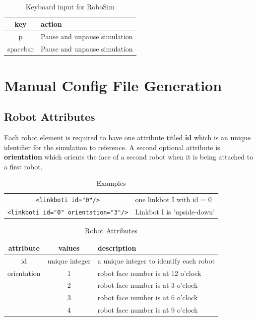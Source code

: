 \documentclass{article}
\begin{document}
\begin{table}[H]
	\begin{center}
	\begin{tabular}{c | l }
		\hline \hline
		\textbf{key} & \textbf{action} \\ \hline
		p & Pause and unpause simulation \\
		spacebar & Pause and unpause simulation \\
		\hline \hline
	\end{tabular}
	\caption{Keyboard input for RoboSim}
	\label{tab:keys}
	\end{center}
\end{table}

\appendix
\section{Manual Config File Generation}
\subsection{Robot Attributes}
Each robot element is required to have one attribute titled \textbf{id} which is an unique identifier for the
simulation to reference.  A second optional attribute is \textbf{orientation} which orients the face of a
second robot when it is being attached to a first robot.

\begin{table}[H]
	\begin{center}
	\begin{tabular}{c | l}
		\hline 
		\verb|<linkboti id="0"/>| & one linkbot I with id = 0 \\
		\verb|<linkboti id="0" orientation="3"/>| & Linkbot I is 'upside-down' \\
		\hline
	\end{tabular}
	\caption{Examples}
	\label{tab:ex}
	\end{center}
\end{table}

\begin{table}[H]
	\begin{center}
	\begin{tabular}{c | c | l}
		\hline \hline
		\textbf{attribute} & \textbf{values} & \textbf{description} \\ \hline
		id & unique integer & a unique integer to identify each robot \\
		orientation & 1 & robot face number is at 12 o'clock \\
		 & 2 & robot face number is at 3 o'clock \\
		 & 3 & robot face number is at 6 o'clock \\
		 & 4 & robot face number is at 9 o'clock \\
		\hline \hline
	\end{tabular}
	\caption{Robot Attributes}
	\label{tab:attributes}
	\end{center}
\end{table}
\end{document}
